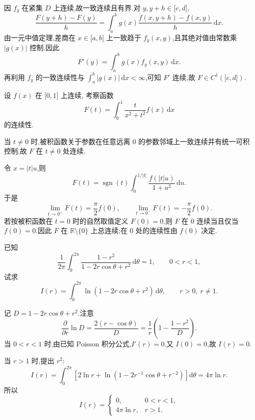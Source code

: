 \begin{solution}
    因 $f_y$ 在紧集 $D$ 上连续,故一致连续且有界.对 $y,y+h\in\lbrack c,d\rbrack$,
    \[
        \dfrac{F(y+h)-F(y)}{h}
        =\int_a^b g(x)\dfrac{f(x,y+h)-f(x,y)}{h}\,\mathrm{d}x.
    \]
    由一元中值定理,差商在 $x\in\lbrack a,b\rbrack$ 上一致趋于 $f_y(x,y)$,且其绝对值由常数乘 $|g(x)|$ 控制.因此
    \[
        F'(y)=\int_a^b g(x)f_y(x,y)\,\mathrm{d}x.
    \]
    再利用 $f_y$ 的一致连续性与 $\displaystyle\int_a^b|g(x)|\,\mathrm{d}x<\infty$,可知 $F'$ 连续,故 $F\in C^1(\lbrack c,d\rbrack)$.
\end{solution}

\begin{example}
    设 $f(x)$ 在 $\lbrack0,1\rbrack$ 上连续, 考察函数
    \[
        F(t)=\int_0^1\dfrac{t}{x^2+t^2}f(x)\,\mathrm{d}x
    \]
    的连续性.
\end{example}
\exampleblank

\begin{solution}
    当 $t\neq0$ 时,被积函数关于参数在任意远离 $0$ 的参数邻域上一致连续并有统一可积控制,故 $F$ 在 $t\neq0$ 处连续.

    令 $x=|t|u$,则
    \[
        F(t)=\operatorname{sgn}(t)\int_0^{1/|t|}\dfrac{f(|t|u)}{1+u^2}\,\mathrm{d}u.
    \]
    于是
    \[
        \lim\limits_{t\to0^+}F(t)=\dfrac{\pi}{2}f(0),
        \qquad
        \lim\limits_{t\to0^-}F(t)=-\dfrac{\pi}{2}f(0).
    \]
    若按被积函数在 $t=0$ 时的自然取值定义 $F(0)=0$,则 $F$ 在 $0$ 连续当且仅当 $f(0)=0$.因此 $F$ 在
    $\mathbb{R}\setminus\{0\}$ 上总连续;在 $0$ 处的连续性由 $f(0)$ 决定.
\end{solution}

\begin{example}
    已知
    \[
        \dfrac{1}{2\pi}\int_0^{2\pi}\dfrac{1-r^2}{1-2r\cos\theta+r^2}\,\mathrm{d}\theta=1,
        \qquad 0<r<1,
    \]
    试求
    \[
        I(r)=\int_0^{2\pi}\ln(1-2r\cos\theta+r^2)\,\mathrm{d}\theta,
        \qquad r>0,\ r\ne1.
    \]
\end{example}
\exampleblank

\begin{solution}
    记 $D=1-2r\cos\theta+r^2$.注意
    \[
        \dfrac{\partial}{\partial r}\ln D
        =\dfrac{2(r-\cos\theta)}{D}
        =\dfrac{1}{r}\left(1-\dfrac{1-r^2}{D}\right).
    \]
    当 $0<r<1$ 时,由已知 Poisson 积分公式,$I'(r)=0$.又 $I(0)=0$,故 $I(r)=0$.

    当 $r>1$ 时,提出 $r^2$:
    \[
        I(r)=\int_0^{2\pi}\left[2\ln r+\ln\left(1-2r^{-1}\cos\theta+r^{-2}\right)\right]\mathrm{d}\theta
        =4\pi\ln r.
    \]
    所以
    \[
        I(r)=
        \begin{cases}
            0,         & 0<r<1, \\
            4\pi\ln r, & r>1.
        \end{cases}
    \]
\end{solution}

